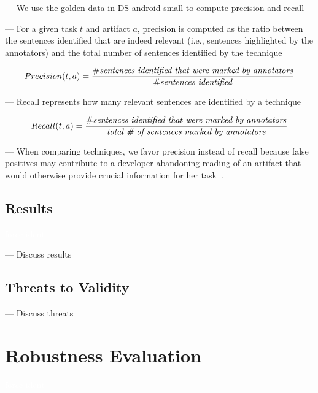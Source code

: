 --- We use the golden data in \acs{DS-android-small} to compute precision and recall


--- For a given task $t$ and artifact $a$, precision is computed as the ratio between the sentences identified that are indeed relevant (i.e., sentences highlighted by the annotators) and the total number of sentences identified by the technique


\begin{equation}
    Precision(t, a) = \frac{\# \text{\textit{sentences identified that were marked by annotators}}}{\# \text{\textit{sentences identified}}}
\end{equation}

\vspace{3mm}

--- Recall represents how many relevant sentences are identified by a technique


\begin{equation}
    Recall(t, a) = \frac{\# \text{\textit{sentences identified that were marked by annotators}}}{\text{\textit{total \# of sentences marked by annotators}}}
\end{equation}

\vspace{3mm}

--- When comparing techniques, we favor precision instead of recall because false positives may contribute to a developer abandoning reading of an artifact that would otherwise provide crucial information for her task~\cite{Rastkar2010}.


\subsection{Results}
\textcolor{white}{force ident} %

--- Discuss results \vspace{3mm}

\subsection{Threats to Validity}

--- Discuss threats \vspace{3mm}



\section{Robustness Evaluation}
\textcolor{white}{force ident} %

